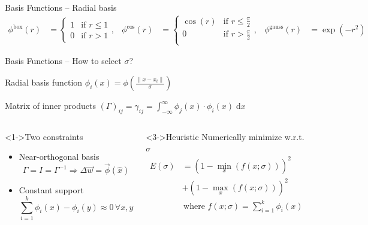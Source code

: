 \documentclass[aspectratio=169]{beamer}
\begin{document}
\begin{frame}{Basis Functions -- Radial basis}
\begin{align*}
	  \phi^\mathrm{box}(r) &= \begin{cases}
				1 & \text{if } r \leq 1 \\
				0 & \text{if } r > 1
	           \end{cases},
	& \phi^\mathrm{cos}(r) &= \begin{cases}
	              \cos(r) & \text{if } r \leq \frac{\pi}2 \\
	              0       & \text{if } r > \frac{\pi}2 \\
	             \end{cases},
	& \phi^\mathrm{gauss}(r) &= \exp\left(-r^2\right)
\end{align*}

\end{frame}

\begin{frame}{Basis Functions -- How to select $\sigma$?}

Radial basis function $\phi_i(x) = \phi\left(\frac{\| x - x_i \|}{\sigma}\right)$

Matrix of inner products $(\Gamma)_{ij} = \gamma_{ij} = \int_{-\infty}^\infty \phi_j(x) \cdot \phi_i(x) \;\mathrm{d}x$

\begin{columns}[t]
	\begin{block}<1->{Two constraints}
	\begin{itemize}
		\item<1-> Near-orthogonal basis
			$$\Gamma = I = \Gamma^{-1} \Rightarrow \Delta \vec w = \vec \phi(\hat x)$$
		\item<2-> Constant support
			$$\sum_{i = 1}^k \phi_i(x) - \phi_i(y) \approx 0 \, \forall x, y$$
	\end{itemize}
	\end{block}
	\begin{block}<3->{Heuristic}
		Numerically minimize w.r.t. $\sigma$
		\begin{align*}
		E(\sigma) &= \left(1 - \min_x(f(x; \sigma))\right)^2 \\
		&+ \left(1 - \max_x(f(x; \sigma))\right)^2 \\
		&\, \text{where } f(x; \sigma) = \sum_{i = 1}^k \phi_i(x)
		\end{align*}
	\end{block}
\end{columns}

\end{frame}
\end{document}

